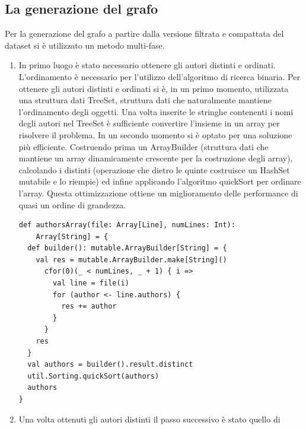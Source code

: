 \documentclass[a4paper,12pt]{article}
\begin{document}
\subsection{La generazione del grafo}
Per la generazione del grafo a partire dalla versione filtrata e compattata del dataset si è utilizzato un metodo multi-fase.
\begin{enumerate}
  \item In primo luogo è stato necessario ottenere gli autori distinti e ordinati. L'ordinamento è necessario per l'utilizzo dell'algoritmo di ricerca binaria. Per ottenere gli autori distinti e ordinati si è, in un primo momento, utilizzata una struttura dati TreeSet, struttura dati che naturalmente mantiene l'ordinamento degli oggetti. Una volta inserite le stringhe contenenti i nomi degli autori nel TreeSet è sufficiente convertire l'insieme in un array per risolvere il problema. In un secondo momento si è optato per una soluzione più efficiente. Costruendo prima un ArrayBuilder (struttura dati che mantiene un array dinamicamente crescente per la costruzione degli array), calcolando i distinti (operazione che dietro le quinte costruisce un HashSet mutabile e lo riempie) ed infine applicando l'algoritmo quickSort per ordinare l'array. Questa ottimizzazione ottiene un miglioramento delle performance di quasi un ordine di grandezza.
  \begin{lstlisting}[keepspaces=true]
def authorsArray(file: Array[Line], numLines: Int):
    Array[String] = {
  def builder(): mutable.ArrayBuilder[String] = {
    val res = mutable.ArrayBuilder.make[String]()
      cfor(0)(_ < numLines, _ + 1) { i =>
        val line = file(i)
        for (author <- line.authors) {
          res += author
        }
      }
    res
  }
  val authors = builder().result.distinct
  util.Sorting.quickSort(authors)
  authors
}    
  \end{lstlisting}
  \item Una volta ottenuti gli autori distinti il passo successivo è stato quello di 
\end{enumerate}
\end{document}
